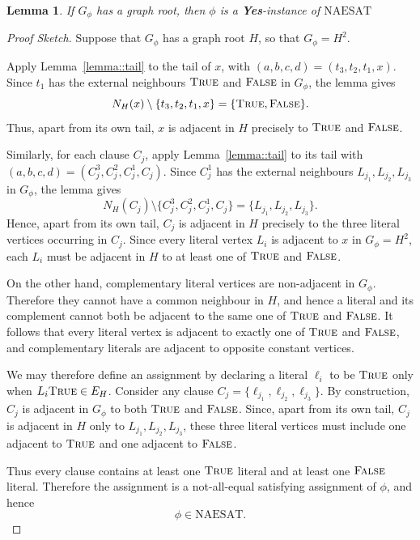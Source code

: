 \documentclass[11pt]{report}
\newtheorem{lemma}{Lemma}
\begin{document}
\begin{lemma} \label{lemma::np_complete_backward}
  If $G_\phi$ has a graph root, then $\phi$ is a \textbf{Yes}-instance of $\mathrm{NAESAT}$
\end{lemma}
\begin{proof}[Proof Sketch] 
  Suppose that $G_\phi$ has a graph root $H$, so that $G_\phi=H^2$. 
  
  Apply Lemma~\ref{lemma::tail} to the tail of $x$, with $(a,b,c,d)=(t_3,t_2,t_1,x)$. Since $t_1$ has the external neighbours $\textsc{True}$ and $\textsc{False}$ in $G_\phi$, the lemma gives 
  \[ 
  N_H(x)\setminus\{t_3,t_2,t_1,x\} = \{\textsc{$\textsc{True}$},\textsc{$\textsc{False}$}\}. 
  \] 
  Thus, apart from its own tail, $x$ is adjacent in $H$ precisely to $\textsc{True}$ and $\textsc{False}$. 
  
  Similarly, for each clause $C_j$, apply Lemma~\ref{lemma::tail} to its tail with $ (a,b,c,d)=(C_j^3,C_j^2,C_j^1,C_j)$. Since $C_j^1$ has the external neighbours $L_{j_1},L_{j_2},L_{j_3}$ in $G_\phi$, the lemma gives 
  \[ 
  N_H(C_j)\setminus \{C_j^3,C_j^2,C_j^1,C_j\} = \{L_{j_1},L_{j_2},L_{j_3}\}. 
  \] 
  Hence, apart from its own tail, $C_j$ is adjacent in $H$ precisely to the three literal vertices occurring in $C_j$. Since every literal vertex $L_i$ is adjacent to $x$ in $G_\phi=H^2$, each $L_i$ must be adjacent in $H$ to at least one of $\textsc{True}$ and $\textsc{False}$. 
  
  On the other hand, complementary literal vertices are non-adjacent in $G_\phi$. Therefore they cannot have a common neighbour in $H$, and hence a literal and its complement cannot both be adjacent to the same one of $\textsc{True}$ and $\textsc{False}$. It follows that every literal vertex is adjacent to exactly one of $\textsc{True}$ and $\textsc{False}$, and complementary literals are adjacent to opposite constant vertices. 
  
  We may therefore define an assignment by declaring a literal $\ell_i$ to be $\textsc{True}$ only when $L_i\textsc{$\textsc{True}$}\in E_H$. Consider any clause $ C_j=\{\ell_{j_1},\ell_{j_2},\ell_{j_3}\}$. By construction, $C_j$ is adjacent in $G_\phi$ to both $\textsc{True}$ and $\textsc{False}$. Since, apart from its own tail, $C_j$ is adjacent in $H$ only to $L_{j_1},L_{j_2},L_{j_3}$, these three literal vertices must include one adjacent to $\textsc{True}$ and one adjacent to $\textsc{False}$. 
  
  Thus every clause contains at least one $\textsc{True}$ literal and at least one $\textsc{False}$ literal. Therefore the assignment is a not-all-equal satisfying assignment of $\phi$, and hence 
  \[ 
  \phi\in\mathrm{NAESAT}. 
  \] 
\end{proof}
\end{document}
